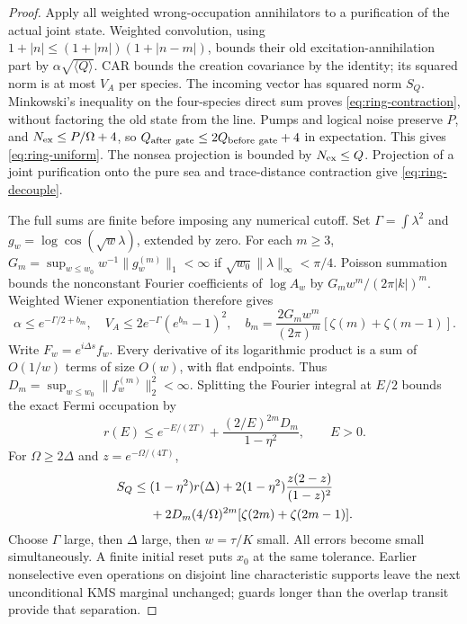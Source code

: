 \begin{proof}
Apply all weighted wrong-occupation annihilators to a purification of
the actual joint state. Weighted convolution, using
$1+|n|\le(1+|m|)(1+|n-m|)$, bounds their old excitation-annihilation
part by $\alpha\sqrt{\langle Q\rangle}$. CAR bounds the creation
covariance by the identity; its squared norm is at most $V_A$ per
species. The incoming vector has squared norm $S_Q$. Minkowski's
inequality on the four-species direct sum proves
\eqref{eq:ring-contraction}, without factoring the old state from the
line. Pumps and logical noise preserve $P$, and
$N_{\rm ex}\le P/\Omega+4$, so
$Q_{\rm after\ gate}\le2Q_{\rm before\ gate}+4$ in expectation.
This gives \eqref{eq:ring-uniform}. The nonsea projection is bounded
by $N_{\rm ex}\le Q$. Projection of a joint purification onto the
pure sea and trace-distance contraction give \eqref{eq:ring-decouple}.

The full sums are finite before imposing any numerical cutoff.
Set $\Gamma=\int\lambda^2$ and $g_w=\log\cos(\sqrt w\lambda)$,
extended by zero. For each $m\ge3$,
$G_m=\sup_{w\le w_0}w^{-1}\|g_w^{(m)}\|_1<\infty$ if
$\sqrt{w_0}\|\lambda\|_\infty<\pi/4$. Poisson summation bounds the
nonconstant Fourier coefficients of $\log A_w$ by
$G_mw^m/(2\pi|k|)^m$. Weighted Wiener exponentiation therefore gives
\begin{equation}
 \alpha\le e^{-\Gamma/2+b_m},\quad
 V_A\le2e^{-\Gamma}(e^{b_m}-1)^2,\quad
 b_m=\frac{2G_mw^m}{(2\pi)^m}[\zeta(m)+\zeta(m-1)].
\end{equation}
Write $F_w=e^{i\Delta s}f_w$. Every derivative of its logarithmic
product is a sum of $O(1/w)$ terms of size $O(w)$, with flat endpoints.
Thus $D_m=\sup_{w\le w_0}\|f_w^{(m)}\|_2^2<\infty$. Splitting the
Fourier integral at $E/2$ bounds the exact Fermi occupation by
\begin{equation}
 r(E)\le e^{-E/(2T)}+\frac{(2/E)^{2m}D_m}{1-\eta^2},\qquad E>0.
\end{equation}
For $\Omega\ge2\Delta$ and $z=e^{-\Omega/(4T)}$,
\begin{align}
 S_Q\le{}&(1-\eta^2)r(\Delta)
     +2(1-\eta^2)\frac{z(2-z)}{(1-z)^2}\notag\\
     &+2D_m(4/\Omega)^{2m}[\zeta(2m)+\zeta(2m-1)].
\end{align}
Choose $\Gamma$ large, then $\Delta$ large, then $w=\tau/K$ small.
All errors become small simultaneously. A finite initial reset puts
$x_0$ at the same tolerance. Earlier nonselective even operations on
disjoint line characteristic supports leave the next unconditional
KMS marginal unchanged; guards longer than the overlap transit provide
that separation.
\end{proof}

